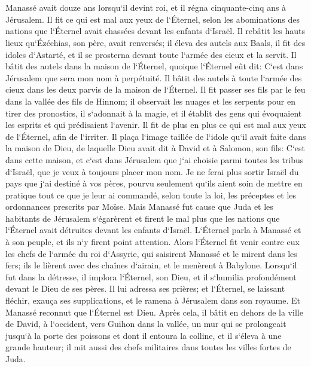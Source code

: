 \chapter{}

\verse Manassé avait douze ans lorsqu`il devint roi, et il régna cinquante-cinq ans à Jérusalem. 
\verse Il fit ce qui est mal aux yeux de l`Éternel, selon les abominations des nations que l`Éternel avait chassées devant les enfants d`Israël. 
\verse Il rebâtit les hauts lieux qu`Ézéchias, son père, avait renversés; il éleva des autels aux Baals, il fit des idoles d`Astarté, et il se prosterna devant toute l`armée des cieux et la servit. 
\verse Il bâtit des autels dans la maison de l`Éternel, quoique l`Éternel eût dit: C`est dans Jérusalem que sera mon nom à perpétuité. 
\verse Il bâtit des autels à toute l`armée des cieux dans les deux parvis de la maison de l`Éternel. 
\verse Il fit passer ses fils par le feu dans la vallée des fils de Hinnom; il observait les nuages et les serpents pour en tirer des pronostics, il s`adonnait à la magie, et il établit des gens qui évoquaient les esprits et qui prédisaient l`avenir. Il fit de plus en plus ce qui est mal aux yeux de l`Éternel, afin de l`irriter. 
\verse Il plaça l`image taillée de l`idole qu`il avait faite dans la maison de Dieu, de laquelle Dieu avait dit à David et à Salomon, son fils: C`est dans cette maison, et c`est dans Jérusalem que j`ai choisie parmi toutes les tribus d`Israël, que je veux à toujours placer mon nom. 
\verse Je ne ferai plus sortir Israël du pays que j`ai destiné à vos pères, pourvu seulement qu`ils aient soin de mettre en pratique tout ce que je leur ai commandé, selon toute la loi, les préceptes et les ordonnances prescrits par Moïse. 
\verse Mais Manassé fut cause que Juda et les habitants de Jérusalem s`égarèrent et firent le mal plus que les nations que l`Éternel avait détruites devant les enfants d`Israël. 
\verse L`Éternel parla à Manassé et à son peuple, et ils n`y firent point attention. 
\verse Alors l`Éternel fit venir contre eux les chefs de l`armée du roi d`Assyrie, qui saisirent Manassé et le mirent dans les fers; ils le lièrent avec des chaînes d`airain, et le menèrent à Babylone. 
\verse Lorsqu`il fut dans la détresse, il implora l`Éternel, son Dieu, et il s`humilia profondément devant le Dieu de ses pères. 
\verse Il lui adressa ses prières; et l`Éternel, se laissant fléchir, exauça ses supplications, et le ramena à Jérusalem dans son royaume. Et Manassé reconnut que l`Éternel est Dieu. 
\verse Après cela, il bâtit en dehors de la ville de David, à l`occident, vers Guihon dans la vallée, un mur qui se prolongeait jusqu`à la porte des poissons et dont il entoura la colline, et il s`éleva à une grande hauteur; il mit aussi des chefs militaires dans toutes les villes fortes de Juda. 
